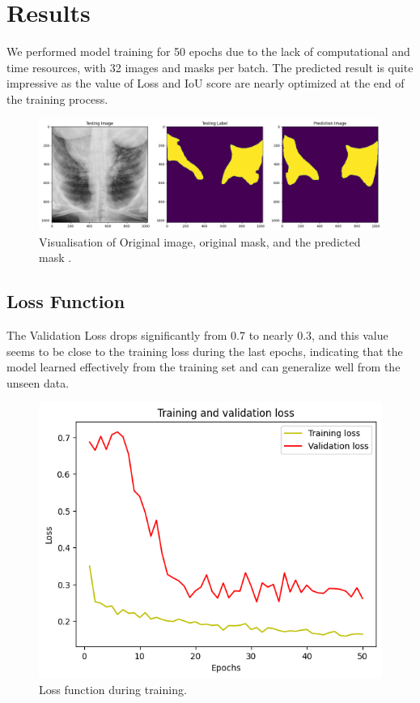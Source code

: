 \documentclass[]{acmsiggraph}
\begin{document}
\section{Results} \label{sec:overview}
We performed model training for 50 epochs due to the lack of computational and time resources, with 32 images and masks per batch. The predicted result is quite impressive as the value of Loss and IoU score are nearly optimized at the end of the training process.

\begin{figure}[h]\centering
 \includegraphics[width=0.75\linewidth]{images/results.png}
 \caption{\label{fig:reference}Visualisation of Original image, original mask, and the predicted mask .}
\end{figure}

\subsection{Loss Function}
The Validation Loss drops significantly from 0.7 to nearly 0.3, and this value seems to be close to the training loss during the last epochs, indicating that the model learned effectively from the training set and can generalize well from the unseen data. 

\begin{figure}[h]\centering
 \includegraphics[width=0.75\linewidth]{images/loss.png}
 \caption{\label{fig:reference}Loss function during training.}
\end{figure}
\end{document}
